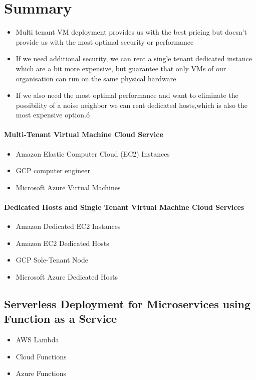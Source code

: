 \section{Summary}
\begin{itemize}
    \item Multi tenant VM deployment provides us with the best pricing but doesn't provide us with the most optimal security or performance
    \item If we need additional security, we can rent a single tenant dedicated instance which are a bit more expensive, but guarantee that only VMs of our organisation can run on the same physical hardware
    \item If we also need the most optimal performance and want to eliminate the possibility of a noise neighbor we can rent dedicated hosts,which is also the most expensive option.ó
\end{itemize}

\paragraph{Multi-Tenant Virtual Machine Cloud Service}
\begin{itemize}
    \item Amazon Elastic Computer Cloud (EC2) Instances
    \item GCP computer engineer
    \item Microsoft Azure Virtual Machines
\end{itemize}

\paragraph{Dedicated Hosts and Single Tenant Virtual Machine Cloud Services}
\begin{itemize}
    \item Amazon Dedicated EC2 Instances
    \item Amazon EC2 Dedicated Hosts
    \item GCP Sole-Tenant Node
    \item Microsoft Azure Dedicated Hosts
\end{itemize}

\subsection{Serverless Deployment for Microservices using Function as a Service}

\begin{itemize}
    \item AWS Lambda
    \item Cloud Functions
    \item Azure Functions
\end{itemize}

